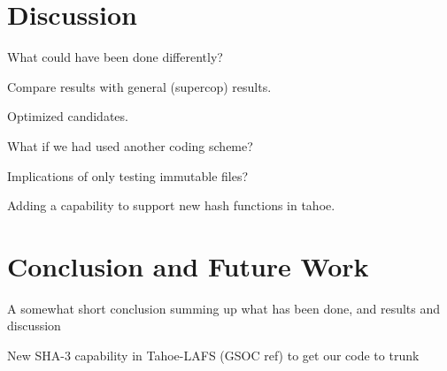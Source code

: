 \documentclass[english,12pt,a4paper]{book}
\begin{document}
\chapter{Discussion}

What could have been done differently?

Compare results with general (supercop) results.

Optimized candidates.

What if we had used another coding scheme?

Implications of only testing immutable files?

Adding a capability to support new hash functions in tahoe.

\chapter{Conclusion and Future Work}

A somewhat short conclusion summing up what has been done, and results and
discussion

New SHA-3 capability in Tahoe-LAFS (GSOC ref) to get our code to trunk






\end{document}

